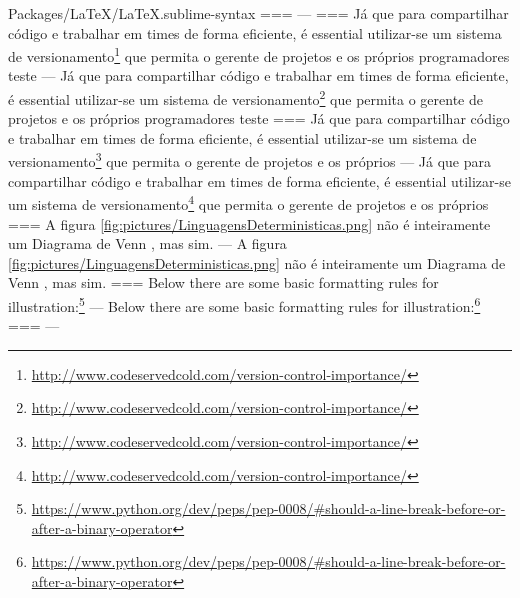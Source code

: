 Packages/LaTeX/LaTeX.sublime-syntax
===
---
===
Já que para compartilhar código e trabalhar em times de forma eficiente, é essential
utilizar\hyp{}se um sistema de
versionamento\footnote{\url{http://www.codeservedcold.com/version-control-importance/}} que permita
o gerente de projetos e os próprios programadores teste
---
Já que para compartilhar código e
trabalhar em times de forma eficiente,
é essential utilizar\hyp{}se um sistema de
versionamento\footnote{\url{http://www.codeservedcold.com/version-control-importance/}}
que permita o gerente de projetos e
os próprios programadores teste
===
Já que para compartilhar código e trabalhar em times de forma eficiente, é essential
utilizar\hyp{}se um sistema de
versionamento\footnote{\url{http://www.codeservedcold.com/version-control-importance/}} que permita
o gerente de projetos e os próprios
---
Já que para compartilhar código e
trabalhar em times de forma eficiente,
é essential utilizar\hyp{}se um sistema de
versionamento\footnote{\url{http://www.codeservedcold.com/version-control-importance/}} que
permita o gerente de projetos e os próprios
===
    A figura \ref{fig:pictures/LinguagensDeterministicas.png} não é
    inteiramente um Diagrama de Venn \cite{generalizedVennDiagrams}, mas sim.
---
    A figura \ref{fig:pictures/LinguagensDeterministicas.png} não é
    inteiramente um Diagrama de Venn \cite{generalizedVennDiagrams},
    mas sim.
===
Below there are some basic formatting rules for
illustration:\footnote{\url{https://www.python.org/dev/peps/pep-0008/#should-a-line-break-before-or-after-a-binary-operator}}
---
Below there are some basic formatting rules for
illustration:\footnote{\url{https://www.python.org/dev/peps/pep-0008/#should-a-line-break-before-or-after-a-binary-operator}}
===
---
